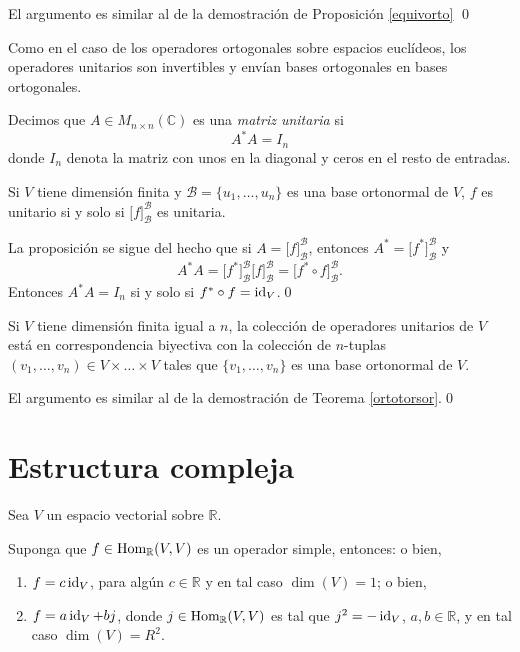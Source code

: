 \dem El argumento es similar al de la demostraci\'on de Proposici\'on \ref{equivorto}
\qed

\begin{obs}
Como en el caso de los operadores ortogonales sobre espacios eucl\'ideos, los operadores unitarios son invertibles y env\'ian bases ortogonales en bases ortogonales. 
\end{obs}

\begin{defn}
Decimos que $A\in M_{n\times n}(\mathbb{C})$ es una \emph{matriz unitaria} si
\[
A^* A=I_n
\]
donde $I_n$ denota la matriz con unos en la diagonal y ceros en el resto de entradas.
\end{defn}

\begin{prop}
Si $V$ tiene dimensi\'on finita y $\mathcal{B}=\{u_1,\ldots,u_n\}$ es una base ortonormal de $V$, $f$ es unitario si y solo si $\Big[f\Big]^\mathcal{B}_\mathcal{B}$ es unitaria. 
\end{prop}

\dem La proposici\'on se sigue del hecho que si $A=\Big[f\Big]^\mathcal{B}_\mathcal{B}$, entonces $A^*=\Big[f^*\Big]^\mathcal{B}_\mathcal{B}$ y
\[
A^* A=\Big[f^*\Big]^\mathcal{B}_\mathcal{B} \Big[f\Big]^\mathcal{B}_\mathcal{B}=\Big[f^*\circ f\Big]^\mathcal{B}_\mathcal{B}.
\]
Entonces $A^* A=I_n$ si y solo si $f^*\circ f=\operatorname{id}_V$.\qed

\begin{teo}
Si $V$ tiene dimensi\'on finita igual a $n$, la colecci\'on de operadores unitarios de $V$ est\'a en correspondencia biyectiva con la colecci\'on de $n$-tuplas $(v_1,\ldots,v_n)\in V\times\ldots\times V$ tales que $\{v_1,\ldots,v_n\}$ es una base ortonormal de $V$.
\end{teo}

\dem El argumento es similar al de la demostraci\'on de Teorema \ref{ortotorsor}.\qed

\section{Estructura compleja}

Sea $V$ un espacio vectorial sobre $\mathbb{R}$.

\begin{pro}
Suponga que $f\in\operatorname{Hom}_{\mathbb{R}}(V,V)$ es un operador simple, entonces: o bien,
\begin{enumerate}
\item $f=c\operatorname{id}_V$, para alg\'un $c\in\mathbb{R}$ y en tal caso $\dim(V)=1$; o bien,
\item $f=a\operatorname{id}_V+bj$, donde $j\in\operatorname{Hom}_{\mathbb{R}}(V,V)$ es tal que $j^2=-\operatorname{id}_V$, $a,b\in\mathbb{R}$, y en tal caso $\dim(V)=R^2$.
\end{enumerate}
\end{pro}

